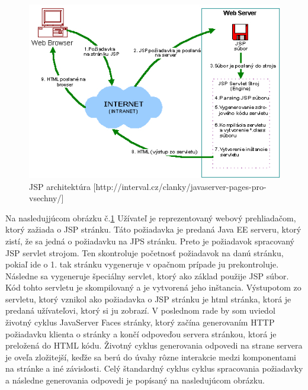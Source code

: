 \begin{figure}[htb]

\begin{center}

\includegraphics[scale=0.5]{architecture.jpg} 
\caption{JSP architektúra [http://interval.cz/clanky/javaserver-pages-pro-vsechny/] }
\label{jsp}

\end{center}

\end{figure}
Na nasledujjúcom obrázku č.\ref{jsp}
Užívateľ je reprezentovaný webový prehliadačom, ktorý zažiada o JSP stránku. Táto požiadavka je predaná Java EE serveru, ktorý zistí, že sa jedná o požiadavku na JPS stránku. Preto je požiadavok spracovaný JSP servlet strojom. Ten skontroluje početnosť požiadavok na danú stránku, pokiaľ ide o 1. tak stránku vygeneruje v opačnom prípade ju prekontroluje. Následne sa vygeneruje špeciálny servlet, ktorý ako základ použije JSP súbor. Kód tohto servletu je skompilovaný a je vytvorená jeho inštancia. Výstupotom zo servletu, ktorý vznikol ako požiadavka o JSP stránku je html stránka, ktorá je predaná užívateľovi, ktorý si ju zobrazí. V poslednom rade by som uviedol životný cyklus JavaServer Faces stránky, ktorý začína generovaním HTTP požiadavku klienta o stránky a končí odpoveďou servera stránkou, ktorá je preložená do HTML kódu.
Životný cyklus generovania odpovedi na strane servera je oveľa zložitejší, keďže sa berú do úvahy rôzne interakcie medzi komponentami na stránke a iné závislosti. Celý štandardný cyklus cyklus spracovania požiadavky a následne generovania odpovedi je popísaný na nasledujúcom obrázku.
